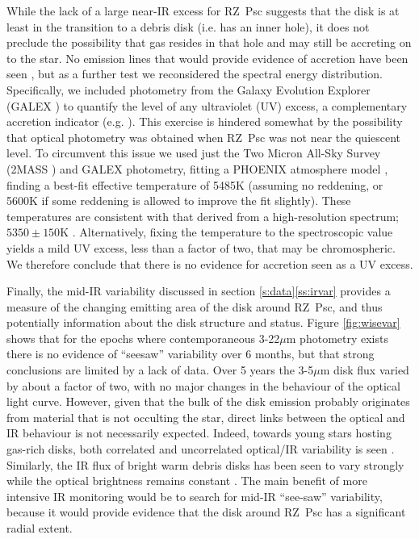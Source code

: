 \documentclass[]{rsos}
\begin{document}
While the lack of a large near-IR excess for RZ~Psc suggests that the disk is at least in
the transition to a debris disk (i.e. has an inner hole), it does not preclude the
possibility that gas resides in that hole and may still be accreting on to the star. No
emission lines that would provide evidence of accretion have been seen
\cite{2013Ap.....56..453P,2014A&A...563A.139P}, but as a further test we reconsidered the
spectral energy distribution. Specifically, we included photometry from the Galaxy
Evolution Explorer (GALEX \cite{2003SPIE.4854..336M}) to quantify the level of any
ultraviolet (UV) excess, a complementary accretion indicator
(e.g. \cite{1998ApJ...509..802C}). This exercise is hindered somewhat by the possibility
that optical photometry was obtained when RZ~Psc was not near the quiescent level. To
circumvent this issue we used just the Two Micron All-Sky Survey (2MASS
\cite{2003tmc..book.....C}) and GALEX photometry, fitting a PHOENIX atmosphere model
\cite{2005ESASP.576..565B}, finding a best-fit effective temperature of 5485K (assuming
no reddening, or 5600K if some reddening is allowed to improve the fit slightly). These
temperatures are consistent with that derived from a high-resolution spectrum;
$5350 \pm 150$K \cite{2014A&A...563A.139P}. Alternatively, fixing the temperature to the
spectroscopic value yields a mild UV excess, less than a factor of two, that may be
chromospheric. We therefore conclude that there is no evidence for accretion seen as a UV
excess.

Finally, the mid-IR variability discussed in section \ref{s:data}\ref{ss:irvar} provides a
measure of the changing emitting area of the disk around RZ~Psc, and thus potentially
information about the disk structure and status. Figure \ref{fig:wisevar} shows that for
the epochs where contemporaneous 3-22$\mu$m photometry exists there is no evidence of
``seesaw'' variability over 6 months, but that strong conclusions are limited by a lack
of data. Over 5 years the 3-5$\mu$m disk flux varied by about a factor of two, with no
major changes in the behaviour of the optical light curve. However, given that the bulk
of the disk emission probably originates from material that is not occulting the star,
direct links between the optical and IR behaviour is not necessarily expected. Indeed,
towards young stars hosting gas-rich disks, both correlated and uncorrelated optical/IR
variability is seen \cite{2014AJ....147...82C}. Similarly, the IR flux of bright warm
debris disks has been seen to vary strongly while the optical brightness remains constant
\cite{2015ApJ...805...77M}. The main benefit of more intensive IR monitoring would be to
search for mid-IR ``see-saw'' variability, because it would provide evidence that the
disk around RZ~Psc has a significant radial extent.
\end{document}
